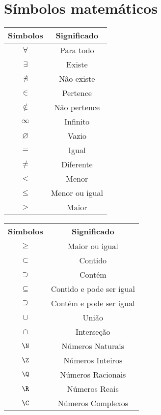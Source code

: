 
\chapter{Símbolos matemáticos}

  \begin{table}[H]
 \centering
 \begin{tabular}{cc} \toprule
 \textbf{Símbolos} & \textbf{Significado} \\\midrule
 $\forall$ & Para todo \\\midrule
 $\exists$ & Existe \\\midrule
 $\nexists$ & Não existe \\\midrule
 $\in$ & Pertence \\\midrule
 $\notin$ & Não pertence \\\midrule
 $\infty$ & Infinito \\\midrule
 $\varnothing$ & Vazio \\\midrule
 $=$ & Igual \\\midrule
 $\neq$ & Diferente \\\midrule
 $<$ & Menor \\\midrule
 $\leq$ & Menor ou igual \\\midrule
 $>$ & Maior \\\toprule
 \end{tabular}
 \begin{tabular}{cc} \toprule
  \hspace{1cm}
  \textbf{Símbolos} & \textbf{Significado} \\\midrule

 $\geq$ & Maior ou igual \\\midrule
 $\subset$ & Contido \\\midrule
 $\supset$ & Contém \\\midrule
 $\subseteq$ & Contido e pode ser igual \\\midrule
 $\supseteq$ & Contém e pode ser igual \\\midrule
 $\cup$ & União \\\midrule
 $\cap$ & Interseção \\\midrule
 $\N$ & Números Naturais \\\midrule
 $\Z$ & Números Inteiros \\\midrule
 $\Q$ & Números Racionais \\\midrule
 $\R$ & Números Reais \\\midrule
 $\C$ & Números Complexos \\\toprule
 \end{tabular}
 \end{table}
